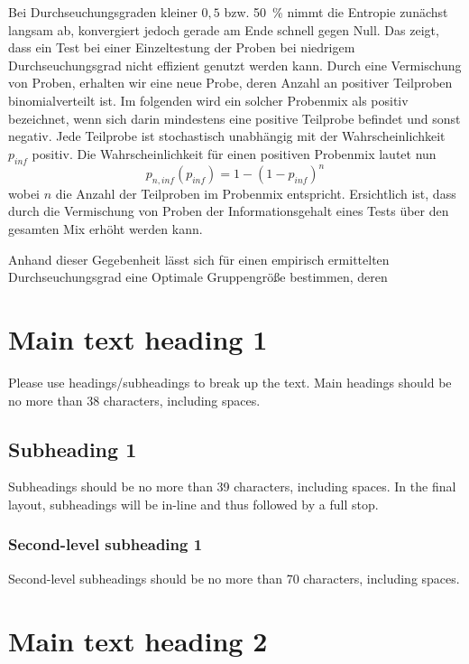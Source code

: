 \documentclass[fleqn,10pt]{wlscirep}
\begin{document}
Bei Durchseuchungsgraden kleiner $0,5$ bzw. \SI{50}{\percent} nimmt die Entropie zunächst langsam ab, konvergiert jedoch gerade am Ende schnell gegen Null. Das zeigt, dass ein Test bei einer Einzeltestung der Proben bei niedrigem Durchseuchungsgrad nicht effizient genutzt werden kann.
Durch eine Vermischung von Proben, erhalten wir eine neue Probe, deren Anzahl an positiver Teilproben binomialverteilt ist. Im folgenden wird ein solcher Probenmix als positiv bezeichnet, wenn sich darin mindestens eine positive Teilprobe befindet und sonst negativ. Jede Teilprobe ist stochastisch unabhängig mit der Wahrscheinlichkeit $p_{inf}$ positiv. Die Wahrscheinlichkeit für einen positiven Probenmix lautet nun
\begin{equation}
p_{n,inf}(p_{inf}) = 1-(1-p_{inf})^n 
\end{equation}
wobei $n$ die Anzahl der Teilproben im Probenmix entspricht. Ersichtlich ist, dass durch die Vermischung von Proben der Informationsgehalt eines Tests über den gesamten Mix erhöht werden kann. 

Anhand dieser Gegebenheit lässt sich für einen empirisch ermittelten Durchseuchungsgrad eine Optimale Gruppengröße bestimmen, deren   

\section*{Main text heading 1}

Please use headings/subheadings to break up the text. Main headings should be no more than 38 characters, including spaces.

\subsection*{Subheading 1}

Subheadings should be no more than 39 characters, including spaces. In the final layout, subheadings will be in-line and thus followed by a full stop.

\subsubsection*{Second-level subheading 1}
Second-level subheadings should be no more than 70 characters, including spaces.

\section*{Main text heading 2}
\end{document}
